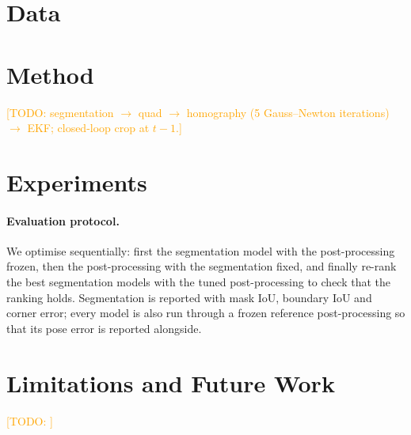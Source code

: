 \documentclass[10pt,twocolumn]{article}
\newcommand{\todo}[1]{\textcolor{orange}{[TODO: #1]}}
\begin{document}
\section{Data}
\label{sec:data}


\section{Method}
\label{sec:method}
\todo{segmentation $\rightarrow$ quad $\rightarrow$ homography (5 Gauss--Newton iterations) $\rightarrow$ EKF; closed-loop crop at $t-1$.}

\section{Experiments}
\label{sec:exp}
\paragraph{Evaluation protocol.}
We optimise sequentially: first the segmentation model with the post-processing frozen, then the post-processing with the segmentation fixed, and finally re-rank the best segmentation models with the tuned post-processing to check that the ranking holds.
Segmentation is reported with mask IoU, boundary IoU and corner error; every model is also run through a frozen reference post-processing so that its pose error is reported alongside.




\section{Limitations and Future Work}
\todo{}



\end{document}
